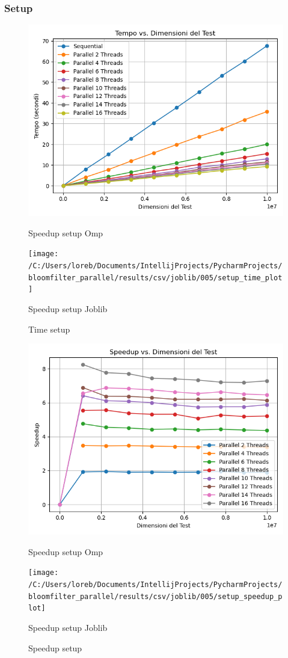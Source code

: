 \documentclass[11pt]{article}
\begin{document}
    \subsubsection{Setup}\label{subsubsec:fpr-005-setup}
    \begin{figure}[H]
        \centering
        \includegraphics[width=\linewidth]{omp/005/setup_time_plot}
            \caption{Speedup setup Omp}\label{fig:005-setup_time_omp}
        \endminipage\hfill
        \texttt{[image: /C:/Users/loreb/Documents/IntellijProjects/PycharmProjects/bloomfilter\_parallel/results/csv/joblib/005/setup\_time\_plot]}
            \caption{Speedup setup Joblib}\label{fig:005-setup_time_joblib}
        \endminipage\hfill
        \caption{Time setup}
    \end{figure}
    \begin{figure}[H]
        \centering
        \includegraphics[width=\linewidth]{omp/005/setup_speedup_plot}
            \caption{Speedup setup Omp}\label{fig:005-setup_speedup_omp}
        \endminipage\hfill
        \texttt{[image: /C:/Users/loreb/Documents/IntellijProjects/PycharmProjects/bloomfilter\_parallel/results/csv/joblib/005/setup\_speedup\_plot]}
            \caption{Speedup setup Joblib}\label{fig:005-setup_speedup_joblib}
        \endminipage\hfill
        \caption{Speedup setup}
    \end{figure}
\end{document}
